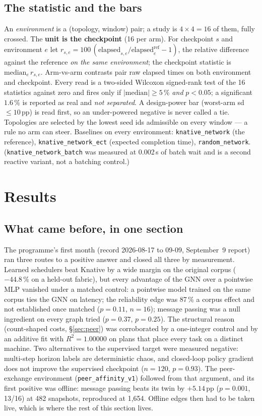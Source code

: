 \documentclass[11pt,a4paper]{article}
\newcommand{\code}[1]{\texttt{\small #1}}
\begin{document}
\subsection{The statistic and the bars}

An \emph{environment} is a (topology, window) pair; a study is $4\times4=16$ of them, fully
crossed. The \textbf{unit is the checkpoint} (16 per arm). For checkpoint $s$ and environment
$e$ let $r_{s,e} = 100\,(\text{elapsed}_{s,e}/\text{elapsed}^{\text{ref}}_{e} - 1)$, the relative
difference against the reference \emph{on the same environment}; the checkpoint statistic is
$\mathrm{median}_e\, r_{s,e}$. Arm-vs-arm contrasts pair raw elapsed times on both environment and
checkpoint. Every read is a two-sided Wilcoxon signed-rank test of the 16 statistics against zero
and fires only if $|\text{median}| \ge 5\,\%$ \emph{and} $p<0.05$; a significant $1.6\,\%$ is
reported as real and \emph{not separated}. A design-power bar (worst-arm sd $\le 10\,$pp) is read
first, so an under-powered negative is never called a tie. Topologies are selected by the lowest
seed ids admissible on every window --- a rule no arm can steer. Baselines on every environment:
\code{knative\_network} (the reference), \code{knative\_network\_ect} (expected completion time),
\code{random\_network}. (\code{knative\_network\_batch} was measured at 0.002\,s of batch wait and
is a second reactive variant, not a batching control.)

\section{Results}
\label{sec:results}

\subsection{What came before, in one section}
\label{sec:history}

The programme's first month (record 2026-08-17 to 09-09, September~9 report) ran three routes to a
positive answer and closed all three by measurement. Learned schedulers beat Knative by a wide
margin on the original corpus ($-44.8\,\%$ on a held-out fabric), but every advantage of the GNN
over a pointwise MLP vanished under a matched control: a pointwise model trained on the same
corpus ties the GNN on latency; the reliability edge was 87\,\% a corpus effect and not
established once matched ($p=0.11$, $n=16$); message passing was a null ingredient on every graph
tried ($p=0.37$, $p=0.25$). The structural reason (count-shaped costs, \S\ref{sec:peer}) was
corroborated by a one-integer control and by an additive fit with $R^2=1.00000$ on plans that place
every task on a distinct machine. Two alternatives to the supervised target were measured
negative: multi-step horizon labels are deterministic chaos, and closed-loop policy gradient does
not improve the supervised checkpoint ($n=120$, $p=0.93$). The peer-exchange environment
(\code{peer\_affinity\_v1}) followed from that argument, and its first positive was offline: message
passing beats its twin by $+5.14\,$pp ($p=0.001$, 13/16) at 482 snapshots, reproduced at 1{,}654.
Offline edges then had to be taken live, which is where the rest of this section lives.
\end{document}
